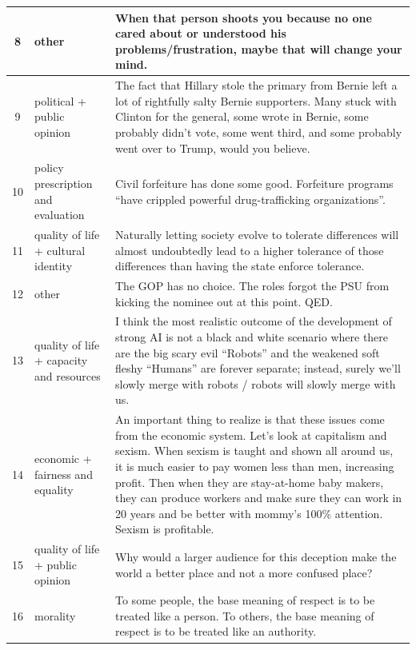 \documentclass[
10pt, %
a4paper, %
oneside, %
headinclude,footinclude, %
] {book}%
\begin{document}
\begin{longtable}{|c|p{4cm}|p{8cm}|}
8 & other & When that person shoots you because no one cared about or understood his problems/frustration, maybe that will change your mind. \\ \hline

9 & political + public opinion & The fact that Hillary stole the primary from Bernie left a lot of rightfully salty Bernie supporters. Many stuck with Clinton for the general, some wrote in Bernie, some probably didn't vote, some went third, and some probably went over to Trump, would you believe. \\ \hline

10 & policy prescription and evaluation & Civil forfeiture has done some good. Forfeiture programs ``have crippled powerful drug-trafficking organizations''. \\ \hline

11 & quality of life + cultural identity & Naturally letting society evolve to tolerate differences will almost undoubtedly lead to a higher tolerance of those differences than having the state enforce tolerance. \\ \hline

12 & other & The GOP has no choice. The roles forgot the PSU from kicking the nominee out at this point. QED. \\ \hline

13 & quality of life + capacity and resources & I think the most realistic outcome of the development of strong AI is not a black and white scenario where there are the big scary evil ``Robots'' and the weakened soft fleshy ``Humans'' are forever separate; instead, surely we'll slowly merge with robots / robots will slowly merge with us. \\ \hline

14 & economic + fairness and equality & An important thing to realize is that these issues come from the economic system. Let's look at capitalism and sexism. When sexism is taught and shown all around us, it is much easier to pay women less than men, increasing profit. Then when they are stay-at-home baby makers, they can produce workers and make sure they can work in 20 years and be better with mommy's 100\% attention. Sexism is profitable. \\ \hline

15 & quality of life + public opinion & Why would a larger audience for this deception make the world a better place and not a more confused place? \\ \hline

16 & morality & To some people, the base meaning of respect is to be treated like a person. To others, the base meaning of respect is to be treated like an authority. \\ \hline


\end{longtable}
\end{document}
